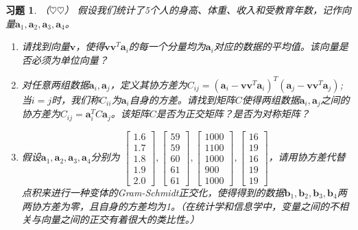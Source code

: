 \documentclass[UTF8]{ctexart}
\newtheorem{ex}[thm]{习题}
\begin{document}
\begin{ex}（$\heartsuit \heartsuit$）
假设我们统计了5个人的身高、体重、收入和受教育年数，记作向量$\bm a_1,\bm a_2,\bm a_3,\bm a_4$。
\begin{enumerate}
\item 请找到向量$\bm v$，使得$\bm v\bm v^{T}\bm a_i$的每一个分量均为$\bm a_i$对应的数据的平均值。该向量是否必须为单位向量？
\item 对任意两组数据$\bm a_i,\bm a_j$，定义其协方差为$C_{ij}=(\bm a_i-\bm v\bm v^{T}\bm a_i)^{T}(\bm a_j-\bm v\bm v^{T}\bm a_j)$; 当$i = j$时，我们称$C_{ii}$为$\bm a_i$自身的方差。请找到矩阵$C$使得两组数据$\bm a_i,\bm a_j$之间的协方差为$C_{ij}= \bm a_i^{T}C\bm a_j$。该矩阵$C$是否为正交矩阵？是否为对称矩阵？
\item 假设$\bm a_1,\bm a_2,\bm a_3,\bm a_4$分别为
	$\begin{bmatrix}1.6\\1.7\\1.8\\1.9\\2.0\end{bmatrix},
	\begin{bmatrix}59\\59\\60\\61\\61\end{bmatrix},
	\begin{bmatrix}1000\\1100\\1000\\900\\1000\end{bmatrix},
	\begin{bmatrix}16\\19\\16\\19\\19\end{bmatrix}$，请用协方差代替点积来进行一种变体的Gram-Schmidt正交化，使得得到的数据$\bm b_1,\bm b_2,\bm b_3,\bm b_4$两两协方差为零，且自身的方差均为1。（在统计学和信息学中，变量之间的不相关与向量之间的正交有着很大的类比性。）
\end{enumerate}
\end{ex}
\end{document}
